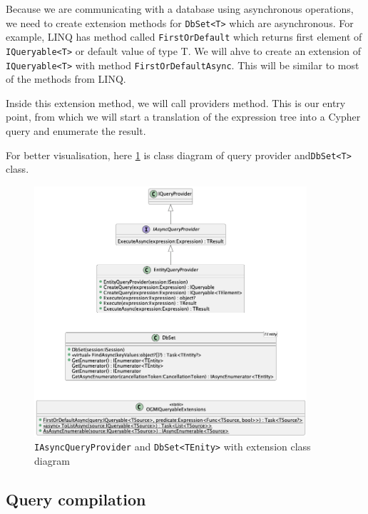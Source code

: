 Because we are communicating with a database using asynchronous operations, we need to create extension methods for \texttt{DbSet<T>} which are asynchronous.
For example, LINQ has method called \texttt{FirstOrDefault} which returns first element of \texttt{IQueryable<T>} or default value of type T.
We will ahve to create an extension of \texttt{IQueryable<T>} with method \texttt{FirstOrDefaultAsync}.
This will be similar to most of the methods from LINQ.

Inside this extension method, we will call providers\linebreak{} method.
This is our entry point, from which we will start a translation of the expression tree into a Cypher query and enumerate the result.

For better visualisation, here \ref{fig:queryprovider} is class diagram of query provider and\linebreak\texttt{DbSet<T>} class.

\begin{figure}[H]
    \centering
    \includegraphics[width=0.9\textwidth]{content/QueryProvider.png}
    \caption{\texttt{IAsyncQueryProvider} and \texttt{DbSet<TEnity>} with extension class diagram}
    \label{fig:queryprovider}
\end{figure}

\subsection{Query compilation}


